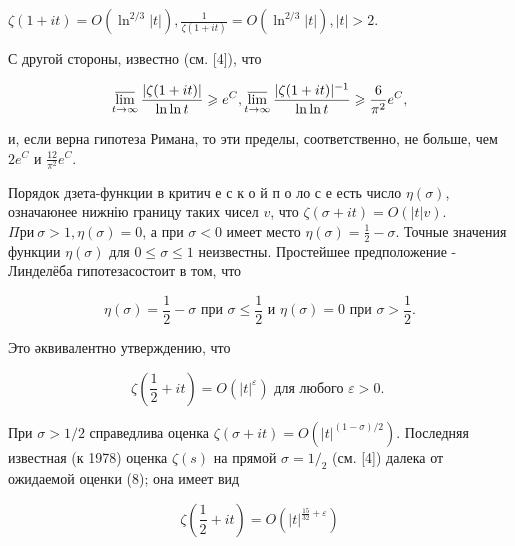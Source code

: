 \documentclass[10pt]{article}
\begin{document}
$\zeta(1+i t)=O\left(\ln ^{2 / 3}|t|\right), \frac{1}{\zeta(1+i t)}=O\left(\ln ^{2 / 3}|t|\right),|t|>2$.



С другой стороны, известно (см. [4]), что



\[

\varlimsup_{t \rightarrow \infty} \frac{|\zeta(1+i t)|}{\ln \ln t} \geqslant e^{C}, \varlimsup_{t \rightarrow \infty} \frac{|\zeta(1+i t)|^{-1}}{\ln \ln t} \geqslant \frac{6}{\pi^{2}} e^{C},

\]



и, если верна гипотеза Римана, то эти пределы, соответственно, не больше, чем $2 e^{C}$ и $\frac{12}{\pi^{2}} e^{C}$.



Порядок дзета-функции в критич е с к о й п о ло с е есть число $\eta(\sigma)$, означаюнее нижнію границу таких чисел $v$, что $\zeta(\sigma+i t)=O(|t| v)$. $\Pi р и ~ \sigma>1, \eta(\sigma)=0$, а при $\sigma<0$ имеет место $\eta(\sigma)=\frac{1}{2}-\sigma$. Точные значения функции $\eta(\sigma)$ для $0 \leqslant \sigma \leqslant 1$ неизвестны. Простейшее предположение - Линделёба гипотезасостоит в том, что



\[

\eta(\sigma)=\frac{1}{2}-\sigma \text { при } \sigma \leqslant \frac{1}{2} \text { и } \eta(\sigma)=0 \text { при } \sigma>\frac{1}{2} .

\]



Это әквивалентно утверждению, что



\[

\zeta\left(\frac{1}{2}+i t\right)=O\left(|t|^{\varepsilon}\right) \text { для любого } \varepsilon>0 \text {. }

\]



При $\sigma>1 / 2$ справедлива оценка $\zeta(\sigma+i t)=O\left(|t|^{(1-\sigma) / 2}\right)$. Последняя известная (к 1978) оценка $\zeta(s)$ на прямой $\sigma=1 /_{2}$ (см. [4]) далека от ожидаемой оценки (8); она имеет вид



\[

\zeta\left(\frac{1}{2}+i t\right)=O\left(|t|^{\frac{15}{32}+\varepsilon}\right)

\]
\end{document}
